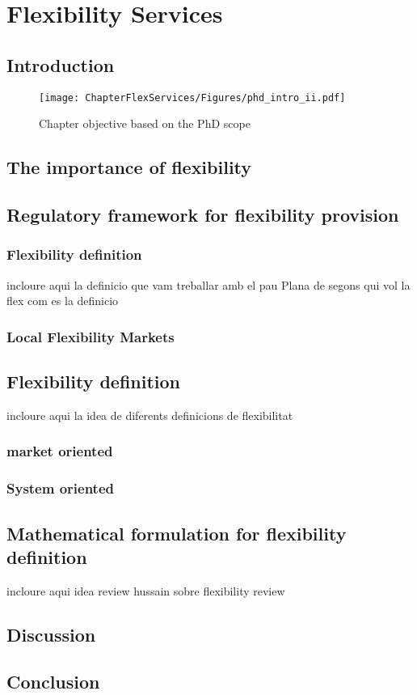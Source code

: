 \chapter{Flexibility Services}
\label{chapterFlexibility}

\section{Introduction}

\begin{figure}[]
	\centering
	\texttt{[image: ChapterFlexServices/Figures/phd\_intro\_ii.pdf]}
		\caption{Chapter objective based on the PhD scope}
	\label{fig:chapter_obj_ii}  
\end{figure}

\section{The importance of flexibility}

\section{Regulatory framework for flexibility provision}
	\subsection{Flexibility definition}
	incloure aqui la definicio que vam treballar amb el pau Plana de segons qui vol la flex com es la definicio
	\subsection{Local Flexibility Markets}
	
\section{Flexibility definition}
incloure aqui la idea de diferents definicions de flexibilitat
\subsection{market oriented}
\subsection{System oriented}

\section{Mathematical formulation for flexibility definition}
incloure aqui idea review hussain sobre flexibility review 

\section{Discussion}
\section{Conclusion}

	


